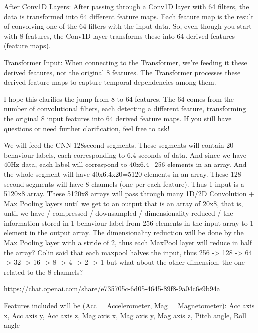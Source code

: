     After Conv1D Layers: After passing through a Conv1D layer with 64 filters, the data is transformed into 64 different feature maps. Each feature map is the result of convolving one of the 64 filters with the input data. So, even though you start with 8 features, the Conv1D layer transforms these into 64 derived features (feature maps).

    Transformer Input: When connecting to the Transformer, we’re feeding it these derived features, not the original 8 features. The Transformer processes these derived feature maps to capture temporal dependencies among them.

I hope this clarifies the jump from 8 to 64 features. The 64 comes from the number of convolutional filters, each detecting a different feature, transforming the original 8 input features into 64 derived feature maps. If you still have questions or need further clarification, feel free to ask!









We will feed the CNN 128second segments. These segments will contain 20 behaviour labels, each corresponding to 6.4 seconds of data. 
And since we have 40Hz data, each label will correspond to 40x6.4=256 elements in an array. And the whole segment will have 
40x6.4x20=5120 elements in an array. These 128 second segments will have 8 channels (one per each feature). 
Thus 1 input is a 5120x8 array. These 5120x8 arrays will pass through many 1D/2D Convolution + Max Pooling layers until 
we get to an output that is an array of 20x8, that is, until we have / compressed / downsampled / dimensionality reduced / 
the information stored in 1 behaviour label from 256 elements in the input array to 1 element in the output array. 
The dimensionality reduction will be done by the Max Pooling layer with a stride of 2, thus each MaxPool layer
will reduce in half the array? Colin said that each maxpool halves the input, thus 256 -> 128 -> 64 -> 32 -> 16 -> 8 -> 4 -> 2 -> 1 
but what about the other dimension, the one related to the 8 channels?

https://chat.openai.com/share/e735705c-6d05-4645-89f8-9a04c6e9b94a



Features included will be (Acc = Accelerometer, Mag = Magnetometer): 
Acc axis x, 
Acc axis y, 
Acc axis z, 
Mag axis x, 
Mag axis y, 
Mag axis z, 
Pitch angle, 
Roll angle



